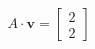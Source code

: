 \documentclass[preview]{standalone}
\begin{document}
\begin{align*}
A \cdot \mathbf{v} = \begin{bmatrix} 2 \\ 2 \end{bmatrix}
\end{align*}
\end{document}
